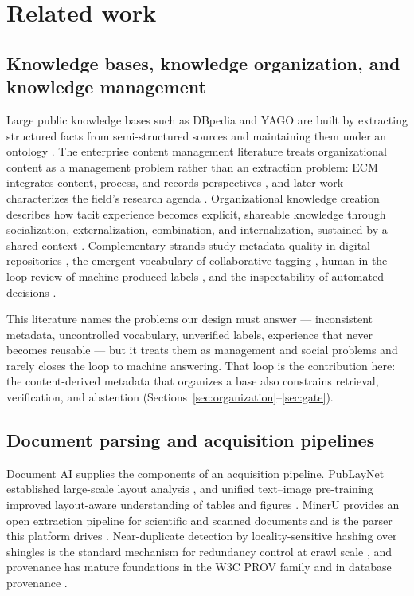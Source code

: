 \section{Related work}
\label{sec:related}

\subsection{Knowledge bases, knowledge organization, and knowledge management}
Large public knowledge bases such as DBpedia and YAGO are built by extracting
structured facts from semi-structured sources and maintaining them under an
ontology \citep{auer-dbpedia-kb-2007,hoffart-yago2-kb-2013}. The enterprise
content management literature treats organizational content as a management
problem rather than an extraction problem: ECM integrates content, process, and
records perspectives \citep{paivarinta-ecm-2005}, and later work characterizes
the field's research agenda \citep{tyrvaainen-ecm-2006}. Organizational
knowledge creation describes how tacit experience becomes explicit, shareable
knowledge through socialization, externalization, combination, and
internalization, sustained by a shared context \citep{nonaka-seci-1994,
nonaka-seci-ba-2000}. Complementary strands study metadata quality in digital
repositories \citep{park-metadata-quality-2009}, the emergent vocabulary of
collaborative tagging \citep{golder-tagging-2006}, human-in-the-loop review of
machine-produced labels \citep{mosqueira-rey-hitl-2022}, and the inspectability
of automated decisions \citep{barredo-arrieta-xai-2020}.

This literature names the problems our design must answer --- inconsistent
metadata, uncontrolled vocabulary, unverified labels, experience that never
becomes reusable --- but it treats them as management and social problems and
rarely closes the loop to machine answering. That loop is the contribution
here: the content-derived metadata that organizes a base also constrains
retrieval, verification, and abstention
(Sections~\ref{sec:organization}--\ref{sec:gate}).

\subsection{Document parsing and acquisition pipelines}
Document AI supplies the components of an acquisition pipeline. PubLayNet
established large-scale layout analysis \citep{zhong-publaynet-layout-2019},
and unified text--image pre-training improved layout-aware understanding of
tables and figures \citep{huang-layoutlmv3-docai-2022}. MinerU provides an open
extraction pipeline for scientific and scanned documents and is the parser this
platform drives \citep{mineru}. Near-duplicate detection by locality-sensitive
hashing over shingles is the standard mechanism for redundancy control at crawl
scale \citep{manku-near-dup-2007}, and provenance has mature foundations in the
W3C PROV family \citep{missier-prov-2013} and in database provenance
\citep{cheney-provenance-2009}.


